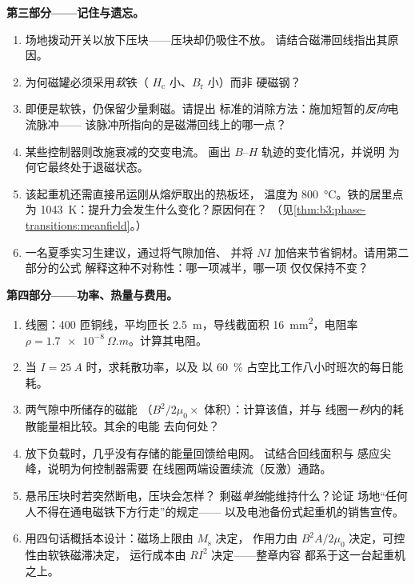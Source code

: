 \begin{problem}
\medskip\noindent\textbf{第三部分——记住与遗忘。}

\begin{enumerate}[resume]
  \item 场地拨动开关以放下压块——压块却仍吸住不放。
        请结合磁滞回线指出其原因。
  \item 为何磁罐必须采用\emph{软}铁（
        $H_{\text{c}}$ 小、$B_{\text{r}}$ 小）而非
        硬磁钢？
  \item 即便是软铁，仍保留少量剩磁。请提出
        标准的消除方法：施加短暂的\emph{反向}电流脉冲——
        该脉冲所指向的是磁滞回线上的哪一点？
  \item 某些控制器则改施衰减的交变电流。
        画出 $B$--$H$ 轨迹的变化情况，并说明
        为何它最终处于退磁状态。
  \item 该起重机还需直接吊运刚从熔炉取出的热板坯，
        温度为 \qty{800}{\celsius}。铁的居里点为
        \qty{1043}{K}：提升力会发生什么变化？原因何在？
        （见\cref{thm:b3:phase-transitions:meanfield}。）
  \item 一名夏季实习生建议，通过将气隙加倍、
        并将 $NI$ 加倍来节省铜材。请用第二部分的公式
        解释这种不对称性：哪一项减半，哪一项
        仅仅保持不变？
\end{enumerate}

\medskip\noindent\textbf{第四部分——功率、热量与费用。}

\begin{enumerate}[resume]
  \item 线圈：400 匝铜线，平均匝长
        \qty{2.5}{m}，导线截面积 \qty{16}{mm^2}，电阻率
        $\rho = \qty{1.7e-8}{\Omega.m}$。计算其电阻。
  \item 当 $I = \qty{25}{A}$ 时，求耗散功率，以及
        以 \qty{60}{\percent} 占空比工作八小时班次的每日能耗。
  \item 两气隙中所储存的磁能
        （$B^2/2\mu_0 \times$ 体积）：计算该值，并与
        线圈一\emph{秒}内的耗散能量相比较。其余的电能
        去向何处？
  \item 放下负载时，几乎没有存储的能量回馈给电网。
        试结合回线面积与
        感应尖峰，说明为何控制器需要
        在线圈两端设置续流（反激）通路。
  \item 悬吊压块时若突然断电，压块会怎样？
        剩磁\emph{单独}能维持什么？论证
        场地“任何人不得在通电磁铁下方行走”的规定——
        以及电池备份式起重机的销售宣传。
  \item 用四句话概括本设计：磁场上限由 $M_{\text{s}}$ 决定，
        作用力由 $B^2A/2\mu_0$ 决定，可控性由软铁磁滞决定，
        运行成本由 $RI^2$ 决定——整章内容
        都系于这一台起重机之上。
\end{enumerate}
\end{problem}
